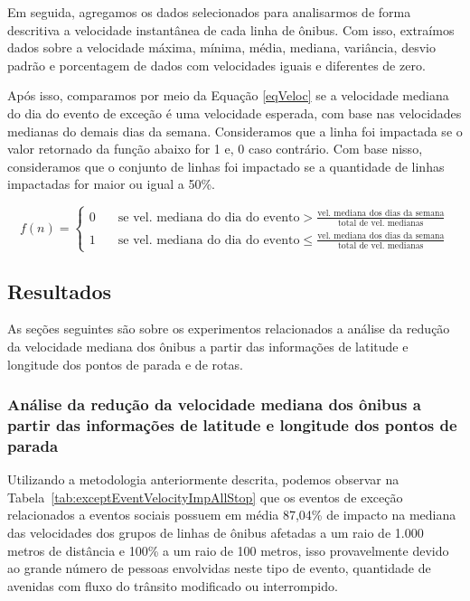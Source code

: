 \documentclass[
	12pt,				%
	oneside,			%
	a4paper,			%
	english,			%
	brazil				%
	]{abntex2ppgsi}
\begin{document}
{{Em seguida, agregamos os dados selecionados para analisarmos  de forma descritiva a velocidade instantânea de cada linha de ônibus. Com isso, extraímos dados sobre a velocidade máxima, mínima, média, mediana, variância, desvio padrão e porcentagem de dados com velocidades iguais e diferentes de zero. 

Após isso, comparamos por meio da Equação \ref{eqVeloc} se a velocidade mediana do dia do evento de exceção é uma velocidade esperada, com base nas velocidades medianas do demais dias da semana.  Consideramos que a linha foi impactada se o valor retornado da função abaixo for 1 e, 0 caso contrário. Com base nisso, consideramos que o conjunto de linhas foi impactado se a quantidade de linhas impactadas for maior ou igual a 50\%.

\begin{equation}
\label{eqVeloc}
 f(n) =
  \begin{cases}
    0      & \quad \text{se  vel.~mediana~do~dia~do~evento} > \frac{\text{vel.~mediana~dos~dias~da~semana}}{\text{total~de~vel.~medianas}}\\
    1 & \quad \text{se vel.~mediana~do~dia~do~evento} \leq \frac{\text{vel.~mediana~dos~dias~da~semana}}{\text{total~de~vel.~medianas}}
  \end{cases}
\end{equation}

\subsection{Resultados}

As seções seguintes são sobre os experimentos relacionados a análise da redução da velocidade mediana dos ônibus a partir das informações de latitude e longitude dos pontos de parada e de rotas.

\subsubsection{Análise da redução da velocidade mediana dos ônibus a partir das informações de latitude e longitude dos pontos de parada}
\label{stopsAnalysis}

Utilizando a metodologia anteriormente descrita, podemos observar na Tabela~\ref{tab:exceptEventVelocityImpAllStop} que os eventos de exceção relacionados a eventos sociais possuem em média 87,04\% de impacto na mediana das velocidades dos grupos de linhas de ônibus afetadas a um raio de 1.000 metros de distância e 100\% a um raio de 100 metros, isso provavelmente devido ao grande número de pessoas envolvidas neste tipo de evento, quantidade de avenidas com fluxo do trânsito modificado ou interrompido.

}}
\end{document}
